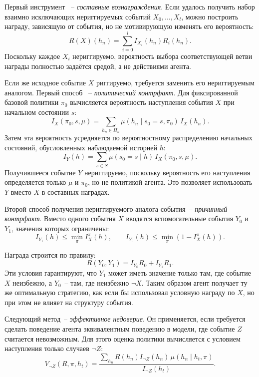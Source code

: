 Первый инструмент ~-- \emph{составные вознаграждения}. Если удалось получить 
набор взаимно исключающих нериггируемых событий $X_0, \dots, X_l$, можно 
построить награду, зависящую от события, но не мотивирующую изменять его вероятность:
\begin{equation}
    R(X)(h_n) = \sum_{i=0}^{l} I_{X_i}(h_n) R_i(h_n).
\end{equation}
Поскольку каждое $X_i$ нериггируемо, вероятность выбора соответствующей ветви 
награды полностью задаётся средой, а не действиями агента.

Если же исходное событие $X$ риггируемо, требуется заменить его нериггируемым 
аналогом. Первый способ ~-- \emph{политический контрфакт}. Для фиксированной 
базовой политики $\pi_0$ вычисляется вероятность наступления события $X$ 
при начальном состоянии $s$:
\begin{equation}
    I_X(\pi_0, s, \mu)
    =
    \sum_{h_n \in H_n}
    \mu(h_n \mid s_0 = s, \pi_0)\, I_X(h_n).
\end{equation}
Затем эта вероятность усредняется по вероятностному распределению начальных 
состояний, обусловленных наблюдаемой историей $h$:
\begin{equation}
    I_Y(h)
    =
    \sum_{s \in S}
    \mu(s_0 = s \mid h)\, I_X(\pi_0, s, \mu).
\end{equation}
Получившееся событие $Y$ нериггируемо, поскольку вероятность его наступления 
определяется только $\mu$ и $\pi_0$, но не политикой агента. Это позволяет 
использовать $Y$ вместо $X$ в составных наградах.

Второй способ получения нериггируемого аналога события~-- \emph{причинный контрфакт}. 
Вместо одного события $X$ вводятся вспомогательные события $Y_0$ и $Y_1$, 
значения которых ограничены:
\begin{equation}
    I_{Y_1}(h) \le \min_{\pi} I_X^\pi(h), \qquad
    I_{Y_0}(h) \le \min_{\pi} (1 - I_X^\pi(h)).
\end{equation}

Награда строится по правилу:
\begin{equation}
    R(Y_0,Y_1) = I_{Y_0} R_0 + I_{Y_1} R_1.
\end{equation}
Эти условия гарантируют, что $Y_1$ может иметь значение только там, 
где событие $X$ неизбежно, а $Y_0$~-- там, где неизбежно $\lnot X$. Таким образом 
агент получает ту же оптимальную стратегию, как если бы использовал условную 
награду по $X$, но при этом не влияет на структуру события.

Следующий метод~-- \emph{эффективное недоверие}. Он применяется, если требуется 
сделать поведение агента эквивалентным поведению в модели, где событие 
$Z$ считается невозможным. Для этого оценка политики вычисляется с условием 
наступления только случаев $\lnot Z$:
\begin{equation}
    V_{\lnot Z}(R,\pi,h_t) =
    \frac{
        \sum_{h_n} R(h_n) I_{\lnot Z}(h_n)\, \mu(h_n \mid h_t,\pi)
    }{
        I_{\lnot Z}(h_t)
    }.
\end{equation}

